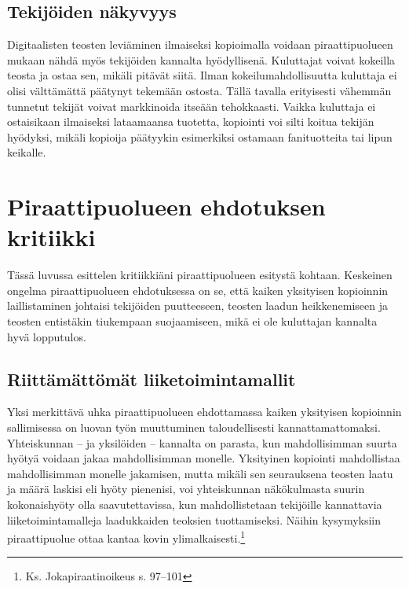 \documentclass[titlepage,12pt]{article}
\begin{document}
\subsection{Tekijöiden näkyvyys}

Digitaalisten teosten leviäminen ilmaiseksi kopioimalla voidaan
piraattipuolueen mukaan nähdä myös tekijöiden kannalta hyödyllisenä.
Kuluttajat voivat kokeilla teosta ja ostaa sen, mikäli pitävät siitä.
Ilman kokeilumahdollisuutta kuluttaja ei olisi välttämättä päätynyt
tekemään ostosta.  Tällä tavalla erityisesti vähemmän tunnetut tekijät
voivat markkinoida itseään tehokkaasti.  Vaikka kuluttaja ei
ostaisikaan ilmaiseksi lataamaansa tuotetta, kopiointi voi silti
koitua tekijän hyödyksi, mikäli kopioija päätyykin esimerkiksi
ostamaan fanituotteita tai lipun keikalle.


\section{Piraattipuolueen ehdotuksen kritiikki}

Tässä luvussa esittelen kritiikkiäni piraattipuolueen esitystä
kohtaan.  Keskeinen ongelma piraattipuolueen ehdotuksessa on se, että
kaiken yksityisen kopioinnin laillistaminen johtaisi tekijöiden
puutteeseen, teosten laadun heikkenemiseen ja teosten entistäkin
tiukempaan suojaamiseen, mikä ei ole kuluttajan kannalta hyvä
lopputulos.

\subsection{Riittämättömät liiketoimintamallit}

Yksi merkittävä uhka piraattipuolueen ehdottamassa kaiken yksityisen
kopioinnin sallimisessa on luovan työn muuttuminen taloudellisesti
kannattamattomaksi.  Yhteiskunnan -- ja yksilöiden -- kannalta on
parasta, kun mahdollisimman suurta hyötyä voidaan jakaa mahdollisimman
monelle.  Yksityinen kopiointi mahdollistaa mahdollisimman monelle
jakamisen, mutta mikäli sen seurauksena teosten laatu ja määrä laskisi
eli hyöty pienenisi, voi yhteiskunnan näkökulmasta suurin
kokonaishyöty olla saavutettavissa, kun mahdollistetaan tekijöille
kannattavia liiketoimintamalleja laadukkaiden teoksien tuottamiseksi.
Näihin kysymyksiin piraattipuolue ottaa kantaa kovin
ylimalkaisesti.\footnote{Ks. Jokapiraatinoikeus s. 97--101}

\end{document}
